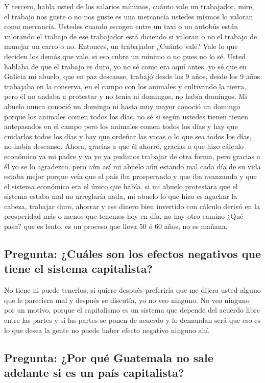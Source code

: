 Y tercero, habla usted de los salarios mínimos, cuánto vale un trabajador, mire, el trabajo nos guste o no nos guste es una mercancía ustedes mismos lo valoran como mercancía. Ustedes cuando escogen entre un taxi o un autobús están valorando el trabajo de ese trabajador está diciendo si valoran o no el trabajo de manejar un carro o no. Entonces, un trabajador ¿Cuánto vale? Vale lo que deciden los demás que vale, si eso cubre un mínimo o no pues no lo sé. Usted hablaba de que el trabajo es duro, yo no sé como era aquí antes, yo sé que en Galicia mi abuelo, que en paz descanse, trabajó desde los 9 años, desde los 9 años trabajaba en la conserva, en el campo con los animales y cultivando la tierra, pero él no andaba a protestar y no tenía ni domingos, no había domingos. Mi abuelo nunca conoció un domingo ni hasta muy mayor conoció un domingo porque los animales comen todos los días, no sé si según ustedes tienen tienen antepasados en el campo pero los animales comen todos los días y hay que cuidarlos todos los días y hay que ordeñar las vacas o lo que sea todos los días, no había descanso. Ahora, gracias a que él ahorró, gracias a que hizo cálculo económico ya mi padre y ya yo ya pudimos trabajar de otra forma, pero gracias a él yo se lo agradezco, pero aún así mi abuelo aún estando mal cada día de su vida estaba mejor porque veía que el país iba prosperando y que iba avanzando y que el sistema económico era el único que había. si mi abuelo protestara que el sistema estaba mal no arreglaría nada, mi abuelo lo que hizo es agachar la cabeza, trabajar duro, ahorrar y ese dinero bien invertido con cálculo derivó en la prosperidad más o menos que tenemos hoy en día, no hay otro camino ¿Qué pasa? que es lento, es un proceso que lleva 50 ó 60 años, no es mañana.

\subsection{Pregunta: ¿Cuáles son los efectos negativos que tiene el sistema capitalista?}

No tiene ni puede tenerlos, si quiere después preferiría que me dijera usted alguno que le pareciera mal y después se discutía, yo no veo ninguno. No veo ninguno por un motivo, porque el capitalismo es un sistema que depende del acuerdo libre entre las partes y si las partes se ponen de acuerdo y lo demandan será que eso es lo que desea la gente no puede haber efecto negativo ninguno ahí.

\subsection{Pregunta: ¿Por qué Guatemala no sale adelante si es un país capitalista?}

